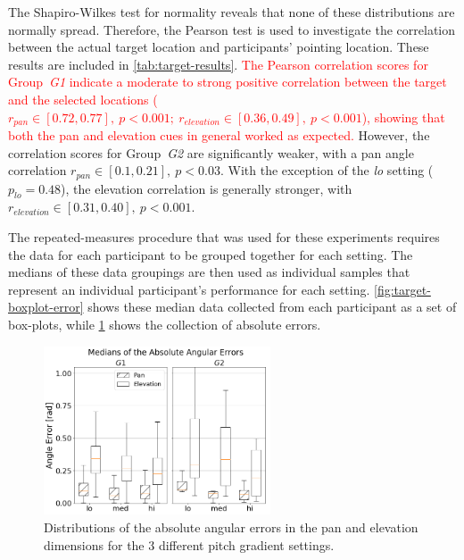 \documentclass[acmsmall]{acmart}
\newcommand\hl[1]{\textcolor{red}{#1}}
\begin{document}
The Shapiro-Wilkes test for normality reveals that none of these distributions are normally spread. Therefore, the Pearson test is used to investigate the correlation between the actual target location and participants' pointing location.
These results are included in \cref{tab:target-results}.
\hl{The Pearson correlation scores for Group~\textit{G1} indicate a moderate to strong positive correlation between the target and the selected locations ($r_{pan} \in [0.72, 0.77],~p < 0.001;~r_{elevation} \in [0.36, 0.49],~p < 0.001$), showing that both the pan and elevation cues in general worked as expected.}
However, the correlation scores for Group~\textit{G2} are significantly weaker, with a pan angle correlation $r_{pan} \in [0.1, 0.21],~p < 0.03$.
With the exception of the \textit{lo} setting ($p_{lo} = 0.48$), the elevation correlation is generally stronger, with $r_{elevation} \in [0.31, 0.40],~p < 0.001$.

The repeated-measures procedure that was used for these experiments requires the data for each participant to be grouped together for each setting.
The medians of these data groupings are then used as individual samples that represent an individual participant's performance for each setting.
\cref{fig:target-boxplot-error} shows these median data collected from each participant as a set of box-plots, while \cref{fig:target-boxplot-absolute-errors} shows the collection of absolute errors.

\begin{figure}
  \centering
  \includegraphics[width=0.6\textwidth]{figures/boxplot_target_search_absolute_median_error.png}
  \caption{Distributions of the absolute angular errors in the pan and elevation dimensions for the 3 different pitch gradient settings. }\label{fig:target-boxplot-absolute-errors}
\end{figure}
\end{document}
